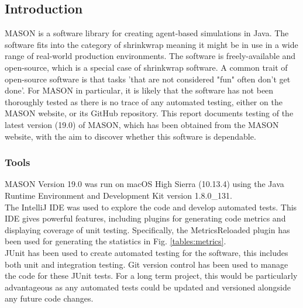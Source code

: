 \documentclass[11pt]{article}
\begin{document}
\subsection{Introduction}
MASON is a software library for creating agent-based simulations in Java. 
The software fits into the category of shrinkwrap meaning it might be in use in a wide range of real-world production environments. The software is freely-available and open-source, which is a special case of shrinkwrap software. A common trait of open-source software is that tasks 'that are not considered "fun" often don't get done'.\cite{five_worlds}
For MASON in particular, it is likely that the software has not been thoroughly tested as there is no trace of any automated testing, either on the MASON website, or its GitHub repository.
This report documents testing of the latest version (19.0) of MASON, which has been obtained from the MASON website, with the aim to discover whether this software is dependable.

\subsubsection{Tools}
MASON Version 19.0 was run on macOS High Sierra (10.13.4) using the Java Runtime Environment and Development Kit version 1.8.0\_131.
\\

The IntelliJ IDE was used to explore the code and develop automated tests.
This IDE gives powerful features, including plugins for generating code metrics and displaying coverage of unit testing.
Specifically, the MetricsReloaded plugin\cite{metrics_reloaded} has been used for generating the statistics in Fig. \ref{tables:metrics}.
\\

JUnit has been used to create automated testing for the software, this includes both unit and integration testing.
Git version control has been used to manage the code for these JUnit tests.
For a long term project, this would be particularly advantageous as any automated tests could be updated and versioned alongside any future code changes.
\end{document}
